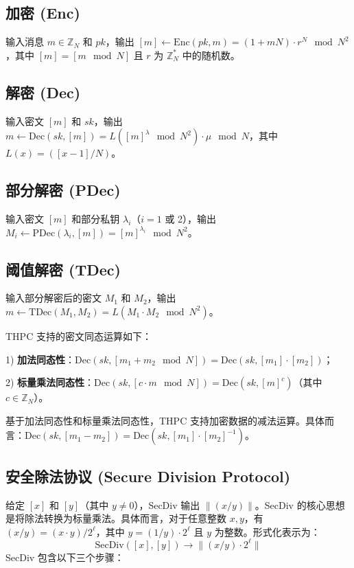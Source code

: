 \subsection{加密 (Enc)}  
输入消息 \( m \in \mathbb{Z}_N \) 和 \( pk \)，输出 \( [m] \leftarrow \text{Enc}(pk, m) = (1 + mN) \cdot r^N \mod N^2 \)，其中 \( [m] = [m \mod N] \) 且 \( r \) 为 \( \mathbb{Z}_N^* \) 中的随机数。

\subsection{解密 (Dec)}  
输入密文 \( [m] \) 和 \( sk \)，输出 \( m \leftarrow \text{Dec}(sk, [m]) = L([m]^{\lambda} \mod N^2) \cdot \mu \mod N \)，其中 \( L(x) = ([x - 1]/N) \)。

\subsection{部分解密 (PDec)}  
输入密文 \( [m] \) 和部分私钥 \( \lambda_i \)（\( i = 1 \) 或 2），输出 \( M_i \leftarrow \text{PDec}(\lambda_i, [m]) = [m]^{\lambda_i} \mod N^2 \)。

\subsection{阈值解密 (TDec)}  
输入部分解密后的密文 \( M_1 \) 和 \( M_2 \)，输出 \( m \leftarrow \text{TDec}(M_1, M_2) = L(M_1 \cdot M_2 \mod N^2) \)。

THPC 支持的密文同态运算如下：

1) \textbf{加法同态性}：\(\text{Dec}(sk, [m_1 + m_2 \mod N]) = \text{Dec}(sk, [m_1] \cdot [m_2])\)；

2) \textbf{标量乘法同态性}：\(\text{Dec}(sk, [c \cdot m \mod N]) = \text{Dec}(sk, [m]^c) \)（其中 \( c \in \mathbb{Z}_N \)）。

基于加法同态性和标量乘法同态性，THPC 支持加密数据的减法运算。具体而言：\(\text{Dec}(sk, [m_1 - m_2]) = \text{Dec}(sk, [m_1] \cdot [m_2]^{-1}) \)。

\subsection{安全除法协议 (Secure Division Protocol)}  
给定 \([x]\) 和 \([y]\)（其中 \(y \neq 0\)），SecDiv 输出 \(\|(x/y)\|\)。SecDiv 的核心思想是将除法转换为标量乘法。具体而言，对于任意整数 \(x, y\)，有 \((x/y) = (x \cdot y)/2^\ell\)，其中 \(y = (1/y) \cdot 2^\ell\) 且 \(y\) 为整数。形式化表示为：  
\[
\text{SecDiv}([x], [y]) \rightarrow \|(x/y) \cdot 2^\ell\|
\]  
SecDiv 包含以下三个步骤：

